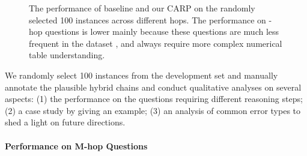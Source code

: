 \documentclass[11pt]{article}
\begin{document}
\begin{figure}[t!]
    \centering
    \caption{
The performance of baseline and our CARP on the randomly selected 100 instances across different hops. 
    The performance on -hop questions is lower mainly because these questions are much less frequent in the dataset \cite{chen2020open}, and always require more complex numerical table understanding.}
\label{fig:hop-analysis}
    \vspace{-5mm}
\end{figure} 	\iffalse
	\begin{figure}[t]
		\centering
		\texttt{[image: hop-analysis-light.pdf]}
		\caption{Performance of the baseline and CARP on the questions of different reasoning complexity. The performance on 1-hop questions is lower mainly because these questions are much less frequent in the dataset \cite{chen2020open}, and always require more complex numerical table understanding (like finding the maximum number).}
		\label{fig:hop-analysis}
	\end{figure}
	\fi
	
	We randomly select 100 instances from the development set and manually annotate the plausible hybrid chains and conduct qualitative analyses on several aspects: 
	(1) the performance on the questions requiring different reasoning steps;
	(2) a case study by giving an example;
	(3) an analysis of common error types to shed a light on future directions. 
	\paragraph{Performance on M-hop Questions}
\end{document}
